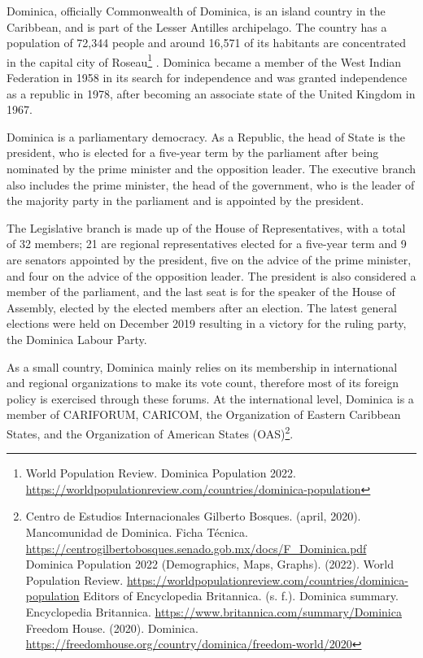 \documentclass[
  10pt,
]{book}
\begin{document}
Dominica, officially Commonwealth of Dominica, is an island country in the Caribbean, and is part of the Lesser Antilles archipelago. The country has a population of 72,344 people and around 16,571 of its habitants are concentrated in the capital city of Roseau\footnote{World Population Review. Dominica Population 2022. \url{https://worldpopulationreview.com/countries/dominica-population}} . Dominica became a member of the West Indian Federation in 1958 in its search for independence and was granted independence as a republic in 1978, after becoming an associate state of the United Kingdom in 1967.

Dominica is a parliamentary democracy. As a Republic, the head of State is the president, who is elected for a five-year term by the parliament after being nominated by the prime minister and the opposition leader. The executive branch also includes the prime minister, the head of the government, who is the leader of the majority party in the parliament and is appointed by the president.

The Legislative branch is made up of the House of Representatives, with a total of 32 members; 21 are regional representatives elected for a five-year term and 9 are senators appointed by the president, five on the advice of the prime minister, and four on the advice of the opposition leader. The president is also considered a member of the parliament, and the last seat is for the speaker of the House of Assembly, elected by the elected members after an election. The latest general elections were held on December 2019 resulting in a victory for the ruling party, the Dominica Labour Party.

As a small country, Dominica mainly relies on its membership in international and regional organizations to make its vote count, therefore most of its foreign policy is exercised through these forums. At the international level, Dominica is a member of CARIFORUM, CARICOM, the Organization of Eastern Caribbean States, and the Organization of American States (OAS)\footnote{Centro de Estudios Internacionales Gilberto Bosques. (april, 2020). Mancomunidad de Dominica. Ficha Técnica. \url{https://centrogilbertobosques.senado.gob.mx/docs/F_Dominica.pdf}
  Dominica Population 2022 (Demographics, Maps, Graphs). (2022). World Population Review. \url{https://worldpopulationreview.com/countries/dominica-population}
  Editors of Encyclopedia Britannica. (s. f.). Dominica summary. Encyclopedia Britannica. \url{https://www.britannica.com/summary/Dominica}
  Freedom House. (2020). Dominica. \url{https://freedomhouse.org/country/dominica/freedom-world/2020}}.
\end{document}
